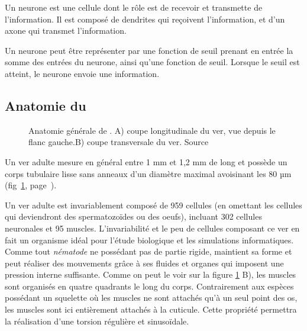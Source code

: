 Un neurone est une cellule dont le rôle est de recevoir et transmette de l'information.
Il est composé de dendrites qui reçoivent l'information, et d'un axone qui transmet
l'information.

Un neurone peut être représenter par une fonction de seuil prenant en entrée la somme
des entrées du neurone, ainsi qu'une fonction de seuil. Lorsque le seuil est atteint,
le neurone envoie une information.



\subsection{Anatomie du \celeg{}} %
\label{sub:Anatomie du caeleg}

\begin{figure}[ht]
   \begin{center}
   \end{center}
   \caption[Anatomie générale de \caeleg{}]{Anatomie générale de \caeleg{}. A) coupe longitudinale du ver,
   vue depuis le flanc gauche.B) coupe transversale du ver. Source
   \cite{Boyle2009}}
   \label{fig:celegans_anatomy}
\end{figure}

Un ver \celeg{} adulte mesure en général entre 1 mm et 1,2 mm de long et
possède un corps tubulaire lisse sans anneaux d'un diamètre maximal
avoisinant les 80 µm (fig~\ref{fig:celegans_anatomy},
page~\pageref{fig:celegans_anatomy}).

Un ver adulte est invariablement composé de 959 cellules (en omettant les
cellules qui deviendront des spermatozoïdes ou des oeufs), incluant 302
cellules neuronales et 95 muscles.  \cite{Boyle2009} L'invariabilité et le peu de
cellules composant ce ver en fait un organisme idéal pour l'étude
biologique et les simulations informatiques.\\


Comme tout \textit{nématode} ne possédant pas de partie rigide, \celeg{}
maintient sa forme et peut réaliser des mouvements grâce à ses fluides et
organes qui imposent une pression interne suffisante. Comme on peut le voir sur
la figure \ref{fig:celegans_anatomy} B), les muscles sont organisés en quatre
quadrants le long du corps. Contrairement aux espèces possédant un squelette où
les muscles ne sont attachés qu'à un seul point des os, les muscles sont ici
entièrement attachés à la cuticule. Cette propriété permettra la réalisation
d'une torsion régulière et sinusoïdale.


